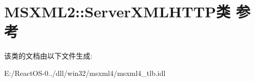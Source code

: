 \hypertarget{class_m_s_x_m_l2_1_1_server_x_m_l_h_t_t_p}{}\section{M\+S\+X\+M\+L2\+:\+:Server\+X\+M\+L\+H\+T\+T\+P类 参考}
\label{class_m_s_x_m_l2_1_1_server_x_m_l_h_t_t_p}


该类的文档由以下文件生成\+:\begin{DoxyCompactItemize}
\item 
E\+:/\+React\+O\+S-\/0../dll/win32/msxml4/msxml4\+\_\+tlb.\+idl\end{DoxyCompactItemize}
